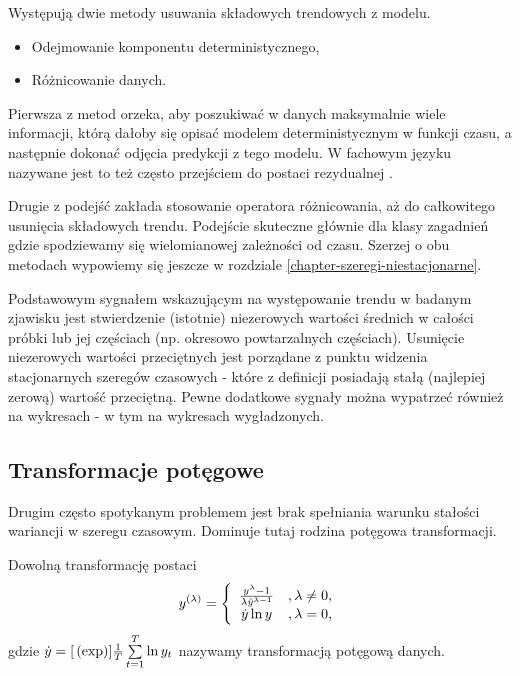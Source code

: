 \documentclass[10pt,a4paper]{book}
\begin{document}
Występują dwie metody usuwania składowych trendowych z modelu. 
\begin{itemize}
\item Odejmowanie komponentu deterministycznego,
\item Różnicowanie danych.
\end{itemize}

Pierwsza z metod orzeka, aby poszukiwać w danych maksymalnie wiele informacji, którą dałoby się opisać modelem deterministycznym w funkcji czasu, a następnie dokonać odjęcia predykcji z tego modelu. W fachowym języku nazywane jest to też często przejściem do postaci rezydualnej .

Drugie z podejść zakłada stosowanie operatora różnicowania, aż do całkowitego usunięcia składowych trendu. Podejście skuteczne głównie dla klasy zagadnień gdzie spodziewamy się wielomianowej zależności od czasu. Szerzej o obu metodach wypowiemy się jeszcze w rozdziale \ref{chapter-szeregi-niestacjonarne}.

Podstawowym sygnałem wskazującym na występowanie trendu w badanym zjawisku jest stwierdzenie (istotnie) niezerowych wartości średnich w całości próbki lub jej częściach (np. okresowo powtarzalnych częściach). Usunięcie niezerowych wartości przeciętnych jest porządane z punktu widzenia stacjonarnych szeregów czasowych - które z definicji posiadają stałą (najlepiej zerową) wartość przeciętną. Pewne dodatkowe sygnały można wypatrzeć również na wykresach - w tym na wykresach wygładzonych.


\subsection{Transformacje potęgowe}

Drugim często spotykanym problemem jest brak spełniania warunku stałości wariancji w szeregu czasowym. Dominuje tutaj rodzina potęgowa transformacji.

\begin{definition}
Dowolną transformację postaci
$$
y^{(\lambda)} = \left \lbrace 
\begin{array}{c l}
\frac{y^\lambda - 1}{\lambda \dot{y}^{\lambda -1} }&, \lambda \neq 0,\\
\dot{y} \ln y&, \lambda =0,
\end{array}
 \right.
$$ 
gdzie $\dot{y} = \function[{\exp}]{\frac{1}{T} \sum_{t=1}^{T}  \ln y_t}$
nazywamy transformacją potęgową danych.
\end{definition}
\end{document}
